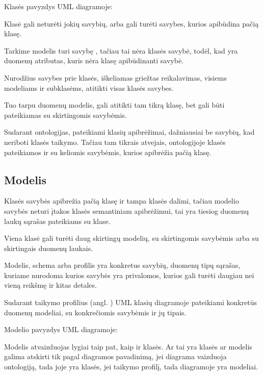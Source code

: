 \documentclass[letterpaper,10pt,lithuanian]{sphinxmanual}
\begin{document}
\sphinxAtStartPar
Klasės pavyzdys UML diagramoje:

\sphinxAtStartPar
Klasė gali neturėti jokių savybių, arba gali turėti savybes, kurios apibūdina
pačią klasę.

\sphinxAtStartPar
Tarkime modelis  turi savybę , tačiau tai nėra klasės
savybė, todėl, kad  yra duomenų atributas, kuris nėra klasę
apibūdinanti savybė.

\sphinxAtStartPar
Nurodžius savybes prie klasės, iškeliamas griežtas reikalavimas, visiems
modeliams ir subklasėms, atitikti visas klasės savybes.

\sphinxAtStartPar
Tuo tarpu duomenų modelis, gali atitikti tam tikrą klasę, bet gali būti
pateikiamas su skirtingomis savybėmis.

\sphinxAtStartPar
Sudarant ontologijas, pateikiami klasių apibrėžimai, dažniausiai be savybių,
kad neriboti klasės taikymo. Tačiau tam tikrais atvejais, ontologijoje klasės
pateikiamos ir su keliomis savybėmis, kurios apibrėžia pačią klasę.


\subsection{Modelis}
\label{\detokenize{modelis:modelis}}\label{\detokenize{modelis:id2}}
\noindent{}

\sphinxAtStartPar
Klasės savybės apibrežia pačią klasę ir tampa klasės dalimi, tačiau modelio
savybės neturi įtakos klasės semantiniam apibrėžimui, tai yra tiesiog duomenų
laukų sąrašas pateikiams su klase.

\sphinxAtStartPar
Viena klasė gali turėti daug skirtingų modelių, su skirtingomis savybėmis arba
su skirtingais duomenų laukais.

\sphinxAtStartPar
Modelis, schema arba profilis yra konkretus savybių, duomenų tipų sąrašas,
kuriame nurodoma kurios savybės yra privalomos, kurios gali turėti daugiau nei
vieną reikšmę ir kitas detales.

\sphinxAtStartPar
Sudarant taikymo profilius (angl. ) UML klasių diagramoje
pateikiami konkretūs duomenų modeliai, su konkrečiomis savybėmis ir jų tipais.

\sphinxAtStartPar
Modelio pavyzdys UML diagramoje:

\sphinxAtStartPar
Modelis atvaizduojas lygiai taip pat, kaip ir klasės. Ar tai yra klasės ar
modelis galima atskirti tik pagal diagramos pavadinimą, jei diagrama vaizduoja
ontologiją, tada joje yra klasės, jei taikymo profilį, tada diagramoje yra
modeliai.
\end{document}
